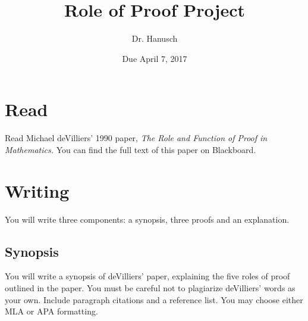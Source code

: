 \documentclass[12pt]{article}
\title{Role of Proof Project}
\author{Dr. Hanusch}  %
\date{Due April 7, 2017}
\begin{document}
\newtheorem{thm}{Theorem}[section]
\newtheorem{cor}[thm]{Corollary}
\newtheorem{lem}[thm]{Lemma}
\newtheorem{prop}[thm]{Proposition}
\theoremstyle{definition}
\newtheorem{defn}[thm]{Definition}
\newtheorem{qu}[]{Question}
\theoremstyle{remark}
\newtheorem{rem}[thm]{Remark}
\newtheorem{prf}[]{Proof}

\newcommand{\norm}[1]{\left\Vert#1\right\Vert}
\newcommand{\abs}[1]{\left\vert#1\right\vert}
\newcommand{\set}[1]{\left\{#1\right\}}
\newcommand{\Real}{\mathbb R}
\newcommand{\eps}{\varepsilon}
\newcommand{\To}{\longrightarrow}
\newcommand{\BX}{\mathbf{B}(X)}
\newcommand{\A}{\mathcal{A}}



\maketitle

\section{Read}

Read Michael deVilliers' 1990 paper, \emph{The Role and Function of Proof in Mathematics.} You can find the full text of this paper on Blackboard.




\section{Writing} 
You will write three components: a synopsis, three proofs and an explanation.

\subsection{Synopsis}

You will write a synopsis of deVilliers' paper, explaining the five roles of proof outlined in the paper. You must be careful not to plagiarize deVilliers' words as your own. Include paragraph citations and a reference list. You may choose either MLA or APA formatting. 
\end{document}
